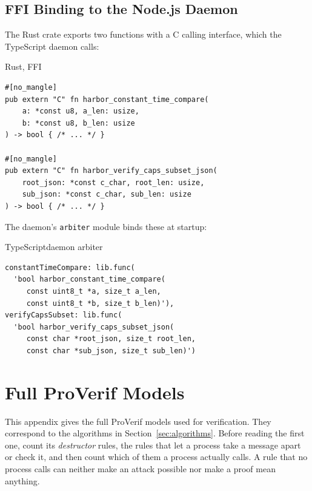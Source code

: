 \documentclass[11pt,a4paper]{article}
\theoremstyle{definition}
\begin{document}


\subsection{FFI Binding to the Node.js Daemon}

The Rust crate exports two functions with a C calling interface, which the TypeScript daemon calls:

\begin{pdlisting}{Rust}{, FFI}
\begin{lstlisting}[style=rust, caption={FFI Exports Called from the Daemon's Arbiter Module}]
#[no_mangle]
pub extern "C" fn harbor_constant_time_compare(
    a: *const u8, a_len: usize,
    b: *const u8, b_len: usize
) -> bool { /* ... */ }

#[no_mangle]
pub extern "C" fn harbor_verify_caps_subset_json(
    root_json: *const c_char, root_len: usize,
    sub_json: *const c_char, sub_len: usize
) -> bool { /* ... */ }
\end{lstlisting}
\end{pdlisting}

The daemon's \texttt{arbiter} module binds these at startup:

\begin{pdlisting}{TypeScript}{daemon arbiter}
\begin{lstlisting}[caption={TypeScript FFI Binding (daemon-side Arbiter)}]
constantTimeCompare: lib.func(
  'bool harbor_constant_time_compare(
     const uint8_t *a, size_t a_len,
     const uint8_t *b, size_t b_len)'),
verifyCapsSubset: lib.func(
  'bool harbor_verify_caps_subset_json(
     const char *root_json, size_t root_len,
     const char *sub_json, size_t sub_len)')
\end{lstlisting}
\end{pdlisting}


\section{Full ProVerif Models}\label{app:proverif}

This appendix gives the full ProVerif models used for verification. They correspond to the algorithms in Section~\ref{sec:algorithms}. Before reading the first one, count its \emph{destructor} rules, the rules that let a process take a message apart or check it, and then count which of them a process actually calls. A rule that no process calls can neither make an attack possible nor make a proof mean anything.
\end{document}
